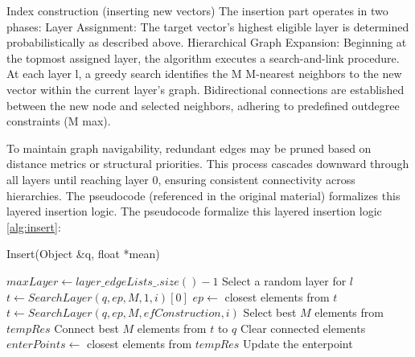 \documentclass[sigconf, nonacm]{acmart}
\begin{document}
Index construction (inserting new vectors)
The insertion part operates in two phases: 
Layer Assignment: The target vector’s highest eligible layer is determined probabilistically as described above.
Hierarchical Graph Expansion: Beginning at the topmost assigned layer, the algorithm executes a search-and-link procedure. At each layer l, a greedy search identifies the M M-nearest neighbors to the new vector within the current layer’s graph.
Bidirectional connections are established between the new node and selected neighbors, adhering to predefined outdegree constraints (M max). 

To maintain graph navigability, redundant edges may be pruned based on distance metrics or structural priorities. This process cascades downward through all layers until reaching layer 0, ensuring consistent connectivity across hierarchies. The pseudocode (referenced in the original material) formalizes this layered insertion logic.
The pseudocode  formalize this layered insertion logic \ref{alg:insert}:

\begin{algorithm}[H]
\caption{Insert(Object \&q, float *mean)} 
\label{alg:insert} 
\begin{algorithmic}[1]
\State $maxLayer \gets layer\_edgeLists\_.size() - 1$
\State Select a random layer for $l$
    \State $t \gets SearchLayer(q, ep, M, 1, i)[0]$
    \State $ep \gets$ closest elements from $t$
\EndFor
{}
    \State $t \gets SearchLayer(q, ep, M, efConstruction, i)$
    \State Select best $M$ elements from $tempRes$
    \State Connect best $M$ elements from $t$ to $q$
    \State Clear connected elements
    \State $enterPoints \gets$ closest elements from $tempRes$
\EndFor
{}
    \State Update the enterpoint
\EndIf
\end{algorithmic}
\end{algorithm}
\end{document}
